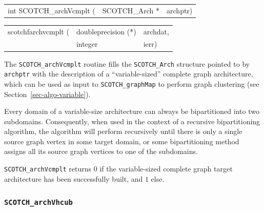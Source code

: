 \begin{itemize}
\progsyn

{\tt\begin{tabular}{l@{}ll}
int SCOTCH\_archVcmplt ( & SCOTCH\_Arch * & archptr)
\end{tabular}}

{\tt\begin{tabular}{l@{}ll}
scotchfarchvcmplt ( & doubleprecision (*) & archdat, \\
                    & integer             & ierr)
\end{tabular}}

\progdes

The {\tt SCOTCH\_archVcmplt} routine fills the {\tt SCOTCH\_\lbt Arch}
structure pointed to by {\tt archptr} with the description of a
``variable-sized'' complete graph architecture, which can be used as
input to {\tt SCOTCH\_\lbt graph\lbt Map} to perform graph clustering
(see Section~\ref{sec-algo-variable}).

Every domain of a variable-size architecture can always be
bipartitioned into two subdomains. Consequently, when used in the
context of a recursive bipartitioning algorithm, the algorithm will
perform recursively until there is only a single source graph vertex
in some target domain, or some bipartitioning method assigns all its
source graph vertices to one of the subdomains.

\progret

{\tt SCOTCH\_archVcmplt} returns $0$ if the variable-sized complete
graph target architecture has been successfully built, and $1$ else.
\end{itemize}

\subsubsection{{\tt SCOTCH\_archVhcub}}

